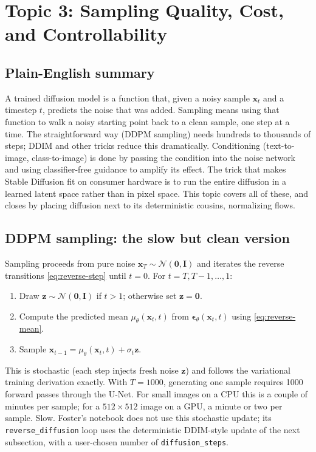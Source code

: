\documentclass[11pt]{article}
\theoremstyle{remark}
\begin{document}
\section{Topic 3: Sampling Quality, Cost, and Controllability}

\subsection{Plain-English summary}

A trained diffusion model is a function that, given a noisy sample $\mathbf{x}_t$ and a timestep $t$, predicts the noise that was added. Sampling means using that function to walk a noisy starting point back to a clean sample, one step at a time. The straightforward way (DDPM sampling) needs hundreds to thousands of steps; DDIM and other tricks reduce this dramatically. Conditioning (text-to-image, class-to-image) is done by passing the condition into the noise network and using classifier-free guidance to amplify its effect. The trick that makes Stable Diffusion fit on consumer hardware is to run the entire diffusion in a learned latent space rather than in pixel space. This topic covers all of these, and closes by placing diffusion next to its deterministic cousins, normalizing flows.

\subsection{DDPM sampling: the slow but clean version}

Sampling proceeds from pure noise $\mathbf{x}_T \sim \mathcal{N}(\mathbf{0}, \mathbf{I})$ and iterates the reverse transitions \eqref{eq:reverse-step} until $t = 0$. For $t = T, T-1, \dots, 1$:
\begin{enumerate}
  \item Draw $\mathbf{z} \sim \mathcal{N}(\mathbf{0}, \mathbf{I})$ if $t > 1$; otherwise set $\mathbf{z} = \mathbf{0}$.
  \item Compute the predicted mean $\mu_\theta(\mathbf{x}_t, t)$ from $\boldsymbol{\epsilon}_\theta(\mathbf{x}_t, t)$ using \eqref{eq:reverse-mean}.
  \item Sample $\mathbf{x}_{t-1} = \mu_\theta(\mathbf{x}_t, t) + \sigma_t \mathbf{z}$.
\end{enumerate}

This is stochastic (each step injects fresh noise $\mathbf{z}$) and follows the variational training derivation exactly. With $T = 1000$, generating one sample requires 1000 forward passes through the U-Net. For small images on a CPU this is a couple of minutes per sample; for a $512\times512$ image on a GPU, a minute or two per sample. Slow. Foster's notebook does not use this stochastic update; its \texttt{reverse\_diffusion} loop uses the deterministic DDIM-style update of the next subsection, with a user-chosen number of \texttt{diffusion\_steps}.
\end{document}

